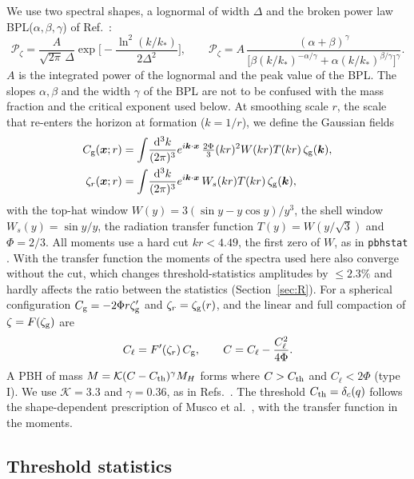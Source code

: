\documentclass{article}
\newcommand{\Cg}{C_{\rm g}}
\newcommand{\Cl}{C_{\ell}}
\newcommand{\zr}{\zeta_r}
\newcommand{\zg}{\zeta_{\rm g}}
\newcommand{\dd}{\mathrm{d}}
\newcommand{\Pz}{\mathcal{P}_\zeta}
\begin{document}
We use two spectral shapes, a lognormal of width $\Delta$ and the broken power law
BPL($\alpha,\beta,\gamma$) of Ref.~\cite{FIVT23}:
\begin{equation}
\Pz=\frac{A}{\sqrt{2\pi}\,\Delta}\exp\Big[-\frac{\ln^2(k/k_*)}{2\Delta^2}\Big],\qquad
\Pz=A\,\frac{(\alpha+\beta)^\gamma}{\big[\beta(k/k_*)^{-\alpha/\gamma}+\alpha(k/k_*)^{\beta/\gamma}\big]^\gamma}.
\label{eq:spectra}
\end{equation}
$A$ is the integrated power of the lognormal and the peak value of the BPL. The slopes
$\alpha,\beta$ and the width $\gamma$ of the BPL are not to be confused with the mass fraction and
the critical exponent used below. At smoothing scale $r$, the scale that re-enters the horizon at
formation ($k=1/r$), we define the Gaussian fields
\begin{align}
\Cg(\bm x;r)&=\int\!\frac{\dd^3k}{(2\pi)^3}e^{i\bm k\cdot\bm x}\,\tfrac{2\Phi}{3}(kr)^2W(kr)T(kr)\,\zg(\bm k),\\
\zr(\bm x;r)&=\int\!\frac{\dd^3k}{(2\pi)^3}e^{i\bm k\cdot\bm x}\,W_s(kr)T(kr)\,\zg(\bm k),
\end{align}
with the top-hat window $W(y)=3(\sin y-y\cos y)/y^3$, the shell window $W_s(y)=\sin y/y$, the
radiation transfer function $T(y)=W(y/\sqrt3)$ and $\Phi=2/3$. All moments use a hard cut
$kr<4.49$, the first zero of $W$, as in \texttt{pbhstat} \cite{ColeFumagalli}. With the transfer
function the moments of the spectra used here also converge without the cut, which changes
threshold-statistics amplitudes by $\le2.3\%$ and hardly affects the ratio between the statistics
(Section~\ref{sec:R}). For a spherical configuration $\Cg=-2\Phi r\zg'$ and $\zr=\zg(r)$, and the
linear and full compaction of $\zeta=F(\zg)$ are \cite{Young19,DeLuca19,Ferrante,Young22}
\begin{equation}
\Cl=F'(\zr)\,\Cg,\qquad C=\Cl-\frac{\Cl^2}{4\Phi}.
\label{eq:Cl}
\end{equation}
A PBH of mass $M=\mathcal K(C-C_{\rm th})^\gamma M_H$ \cite{EC94,NJ98,MM13} forms where
$C>C_{\rm th}$ and $\Cl<2\Phi$ (type I). We use $\mathcal K=3.3$ and $\gamma=0.36$, as in
Refs.~\cite{Ferrante,Ianniccari}. The threshold $C_{\rm th}=\delta_c(q)$ follows the
shape-dependent prescription of Musco et al.~\cite{Musco19,EGS20,Musco21}, with the transfer
function in the moments.

\subsection{Threshold statistics}
\end{document}

